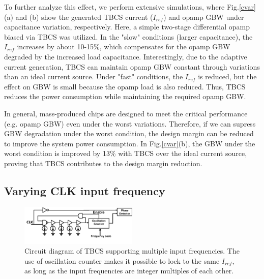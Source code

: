 \documentclass[letterpaper, 10 pt, conference]{ieeeconf}  %
\begin{document}
To further analyze this effect, we perform extensive simulations, where Fig.\ref{cvar}(a) and (b) show the generated TBCS current ($I_{ref}$) and opamp GBW under capacitance variation, respectively. Here, a simple two-stage differential opamp biased via TBCS was utilized. In the "slow" conditions (larger capacitance), the $I_{ref}$ increases by about 10-15\%, which compensates for the opamp GBW degraded by the increased load capacitance. Interestingly, due to the adaptive current generation, TBCS can maintain opamp GBW constant through variations than an ideal current source. Under "fast" conditions, the $I_{ref}$ is reduced, but the effect on GBW is small because the opamp load is also reduced. Thus, TBCS reduces the power consumption while maintaining the required opamp GBW. 

In general, mass-produced chips are designed to meet the critical performance (e.g. opamp GBW) even under the worst variations. Therefore, if we can supress GBW degradation under the worst condition, the design margin can be  reduced to improve the system power consumption. In Fig.\ref{cvar}(b), the GBW under the worst condition is improved by 13\% with TBCS over the ideal current source, proving that TBCS contributes to the design margin reduction.

\subsection{Varying CLK input frequency}
\begin{figure}[!]
\centering
 \includegraphics[width=0.5\textwidth]{figs/osc_tbcs.png}
  \caption{Circuit diagram of TBCS supporting multiple input frequencies. The use of oscillation  counter makes it possible to lock to the same $I_{ref}$, as long as the input frequencies are integer multiples of each other.}
\label{counter}
\end{figure}
\end{document}
